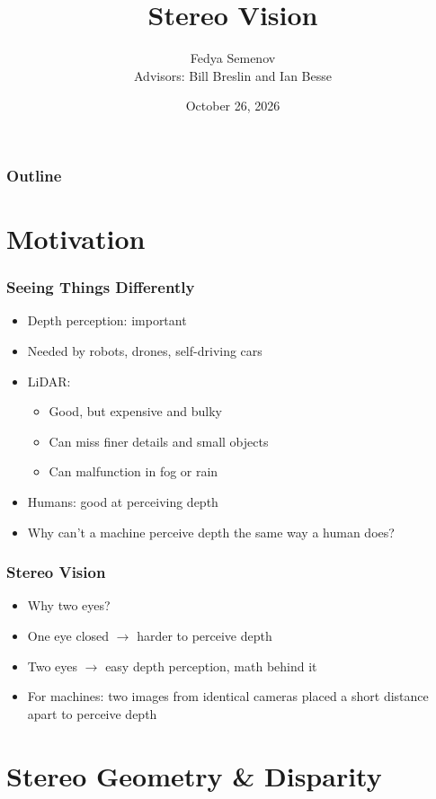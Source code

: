 \documentclass{beamer}
\title{Stereo Vision}
\author[Fedya Semenov]{
  Fedya Semenov \\ 
  \vspace{0.3em}
  {\normalsize Advisors: Bill Breslin and Ian Besse}
}
\institute{Pacific University}
\date{October 26, 2026}
\begin{document}
\frame{\titlepage}

\begin{frame}
\frametitle{Outline}
\tableofcontents
\end{frame}

\section{Motivation}

\begin{frame}
\frametitle{Seeing Things Differently}
\begin{itemize}
    \item Depth perception: important \pause
    \item Needed by robots, drones, self-driving cars \pause
    \item LiDAR:
    \begin{itemize}
        \item Good, but expensive and bulky
        \item Can miss finer details and small objects
        \item Can malfunction in fog or rain
    \end{itemize} \pause
    \item Humans: good at perceiving depth \pause
    \item Why can't a machine perceive depth the same way a human does?
\end{itemize}
\end{frame}

\begin{frame}
\frametitle{Stereo Vision}
\begin{itemize}
    \item Why two eyes? \pause
    \item One eye closed $\rightarrow$ harder to perceive depth \pause
    \item Two eyes $\rightarrow$ easy depth perception, math behind it \pause
    \item For machines: two images from identical cameras placed a short distance apart to perceive depth \cite{scharstein2002taxonomy, zbontar2016stereo}
\end{itemize}
\end{frame}

\section{Stereo Geometry \& Disparity}
\end{document}
